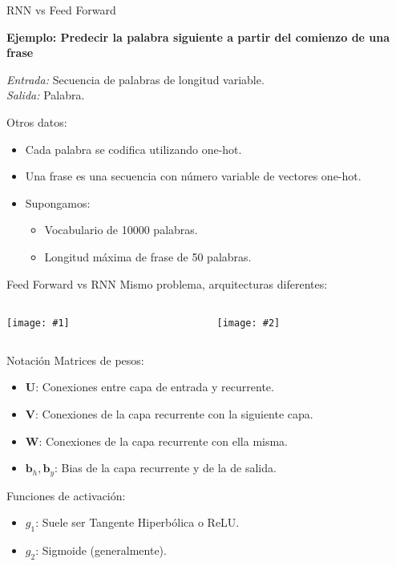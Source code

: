 \documentclass[aspectratio=169]{beamer}
\newenvironment{blockm}[1]{%
  \begin{block}{\textbf{#1}}%
  }{%
  \end{block}%
  \vspace{1em}%
}
\newcommand{\twoimages}[3]{%
  \begin{columns}
    \begin{column}{0.5\textwidth}
      \centering
      \texttt{[image: \#1]}
    \end{column}
    \begin{column}{0.5\textwidth}
      \centering
      \texttt{[image: \#2]}
    \end{column}
  \end{columns}
}
\begin{document}
\begin{frame}{RNN vs Feed Forward}
  \begin{blockm}{\textbf{Ejemplo:} Predecir la palabra siguiente a partir del comienzo de una frase}
    \textit{Entrada:} Secuencia de palabras de longitud variable.\\
    \textit{Salida:} Palabra.
  \end{blockm}
  Otros datos:
  \begin{itemize}
    \item Cada palabra se codifica utilizando one-hot.
    \item Una frase es una secuencia con número variable de vectores one-hot.
    \item Supongamos:
    \begin{itemize}
      \item Vocabulario de 10000 palabras.
      \item Longitud máxima de frase de 50 palabras.
    \end{itemize}
  \end{itemize}
\end{frame}

\begin{frame}{Feed Forward vs RNN}
  Mismo problema, arquitecturas diferentes:
  \vspace{1em}
  \twoimages{imgs/tema4/rnn/EX1.pdf}{imgs/tema4/rnn/EX2.pdf}{0.75}
\end{frame}


\begin{frame}{Notación}
	Matrices de pesos:
	\begin{itemize}
	  \item $\mathbf{U}$: Conexiones entre capa de entrada y recurrente.
	  \item $\mathbf{V}$: Conexiones de la capa recurrente con la siguiente capa.
	  \item $\mathbf{W}$: Conexiones de la capa recurrente con ella misma.
	  \item $\mathbf{b}_{h}, \mathbf{b}_{y}$: Bias de la capa recurrente y de la de salida.
	\end{itemize}
	\vspace{1em}
	Funciones de activación:
	\begin{itemize}
	  \item $g_{1}$: Suele ser Tangente Hiperbólica o ReLU.
	  \item $g_{2}$: Sigmoide (generalmente).
	\end{itemize}
  \end{frame}
\end{document}

